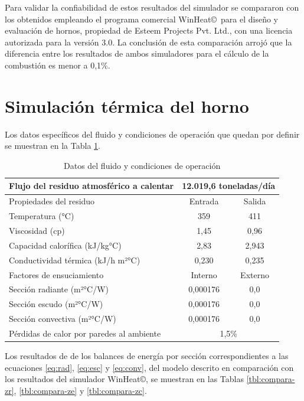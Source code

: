 \par Para validar la confiabilidad de estos resultados del simulador se compararon con los obtenidos empleando el programa comercial WinHeat\copyright\ para el diseño y evaluación de hornos, propiedad de Esteem Projects Pvt. Ltd., con una licencia autorizada para la versión 3.0. La conclusión de esta comparación arrojó que la diferencia entre los resultados de ambos simuladores para el cálculo de la combustión es menor a 0,1\%. 
\section{Simulación térmica del horno}
\par Los datos específicos del fluido y condiciones de operación que quedan por definir se muestran en la Tabla \ref{tbl:props}.
\begin{table}[htb]\begin{center}
\caption[Datos del fluido y condiciones de operación]{Datos del fluido y condiciones de operación}
\label{tbl:props}\begin{tabular}{l|c|c}
	Flujo del residuo atmosférico a calentar  & \multicolumn{2}{c}{12.019,6 toneladas/día} \\
	\hline
    Propiedades del residuo  & Entrada   & Salida \\
    Temperatura          (°C)       & 359    & 411 \\
	Viscosidad	         (cp)	    & 1,45	& 0,96 \\
	Capacidad calorífica (kJ/kg°C)	& 2,83 	& 2,943	 \\
	Conductividad térmica (kJ/h m²°C) & 0,230& 0,235	 \\
	\hline
	Factores de ensuciamiento & Interno & Externo\\
	Sección radiante	(m²°C/W)  & 0,000176	& 0,0 \\
	Sección escudo		(m²°C/W)  & 0,000176	& 0,0 \\
	Sección convectiva	(m²°C/W)  & 0,000176	& 0,0 \\
    \hline
	Pérdidas de calor por paredes al ambiente & \multicolumn{2}{c}{1,5\%} \\
\end{tabular}\end{center}\end{table}
\par Los resultados de de los balances de energía por sección correspondientes a las ecuaciones \ref{eq:rad}, \ref{eq:esc} y \ref{eq:conv}, del modelo descrito en comparación con los resultados del simulador WinHeat\copyright, se muestran en las Tablas \ref{tbl:compara-zr}, \ref{tbl:compara-ze} y \ref{tbl:compara-zc}.
